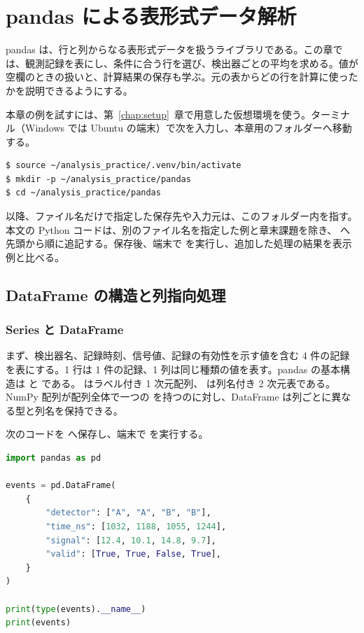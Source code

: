 \chapter{pandas による表形式データ解析}
\label{chap:pandas}

pandas は、行と列からなる表形式データを扱うライブラリである。この章では、観測記録を表にし、条件に合う行を選び、検出器ごとの平均を求める。値が空欄のときの扱いと、計算結果の保存も学ぶ。元の表からどの行を計算に使ったかを説明できるようにする。

本章の例を試すには、第~\ref{chap:setup}~章で用意した仮想環境を使う。ターミナル（Windows では Ubuntu の端末）で次を入力し、本章用のフォルダーへ移動する。

\begin{lstlisting}[numbers=none, xleftmargin=2\zw]
$ source ~/analysis_practice/.venv/bin/activate
$ mkdir -p ~/analysis_practice/pandas
$ cd ~/analysis_practice/pandas
\end{lstlisting}

以降、ファイル名だけで指定した保存先や入力元は、このフォルダー内を指す。本文の Python コードは、別のファイル名を指定した例と章末課題を除き、 へ先頭から順に追記する。保存後、端末で  を実行し、追加した処理の結果を表示例と比べる。

\section{DataFrame の構造と列指向処理}

\subsection{Series と DataFrame}

まず、検出器名、記録時刻、信号値、記録の有効性を示す値を含む 4 件の記録を表にする。1 行は 1 件の記録、1 列は同じ種類の値を表す。pandas の基本構造は  と  である。 はラベル付き 1 次元配列、 は列名付き 2 次元表である。NumPy 配列が配列全体で一つの  を持つのに対し、DataFrame は列ごとに異なる型と列名を保持できる。

次のコードを  へ保存し、端末で  を実行する。

\begin{lstlisting}[language=Python]
import pandas as pd

events = pd.DataFrame(
    {
        "detector": ["A", "A", "B", "B"],
        "time_ns": [1032, 1188, 1055, 1244],
        "signal": [12.4, 10.1, 14.8, 9.7],
        "valid": [True, True, False, True],
    }
)

print(type(events).__name__)
print(events)
\end{lstlisting}

